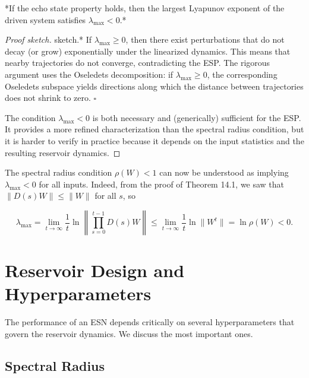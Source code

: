 \begin{theorem}\label{thm:14.2}
*If the echo state property holds, then the largest Lyapunov exponent of the driven system satisfies $\lambda_{\max} < 0$.*
\end{theorem}


\begin{proof}[Proof sketch]
sketch.* If $\lambda_{\max} \geq 0$, then there exist perturbations that do not decay (or grow) exponentially under the linearized dynamics. This means that nearby trajectories do not converge, contradicting the ESP. The rigorous argument uses the Oseledets decomposition: if $\lambda_{\max} \geq 0$, the corresponding Oseledets subspace yields directions along which the distance between trajectories does not shrink to zero. $\square$

The condition $\lambda_{\max} < 0$ is both necessary and (generically) sufficient for the ESP. It provides a more refined characterization than the spectral radius condition, but it is harder to verify in practice because it depends on the input statistics and the resulting reservoir dynamics.

\end{proof}

\begin{remark}
The spectral radius condition $\rho(W) < 1$ can now be understood as implying $\lambda_{\max} < 0$ for all inputs. Indeed, from the proof of Theorem 14.1, we saw that $\|D(s)W\| \leq \|W\|$ for all $s$, so

\[
\lambda_{\max} = \lim_{t \to \infty} \frac{1}{t} \ln \left\| \prod_{s=0}^{t-1} D(s) W \right\| \leq \lim_{t \to \infty} \frac{1}{t} \ln \|W^t\| = \ln \rho(W) < 0.
\]


\bigskip

\end{remark}


\section{Reservoir Design and Hyperparameters}\label{sec:14.4}

The performance of an ESN depends critically on several hyperparameters that govern the reservoir dynamics. We discuss the most important ones.

\subsection{Spectral Radius}\label{sec:14.4.1}

